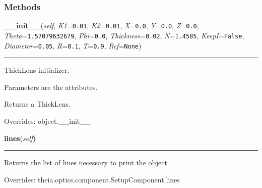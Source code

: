
  \subsubsection{Methods}

    \vspace{0.5ex}

\hspace{.8\funcindent}\begin{boxedminipage}{\funcwidth}

    \raggedright \textbf{\_\_init\_\_}(\textit{self}, \textit{K1}={\tt 0.01}, \textit{K2}={\tt 0.01}, \textit{X}={\tt 0.0}, \textit{Y}={\tt 0.0}, \textit{Z}={\tt 0.0}, \textit{Theta}={\tt 1.57079632679}, \textit{Phi}={\tt 0.0}, \textit{Thickness}={\tt 0.02}, \textit{N}={\tt 1.4585}, \textit{KeepI}={\tt False}, \textit{Diameter}={\tt 0.05}, \textit{R}={\tt 0.1}, \textit{T}={\tt 0.9}, \textit{Ref}={\tt None})

    \vspace{-1.5ex}

    \rule{\textwidth}{0.5\fboxrule}
\setlength{\parskip}{2ex}
    ThickLens initializer.

    Parameters are the attributes.

    Returns a ThickLens.

\setlength{\parskip}{1ex}
      Overrides: object.\_\_init\_\_

    \end{boxedminipage}

    \vspace{0.5ex}

\hspace{.8\funcindent}\begin{boxedminipage}{\funcwidth}

    \raggedright \textbf{lines}(\textit{self})

    \vspace{-1.5ex}

    \rule{\textwidth}{0.5\fboxrule}
\setlength{\parskip}{2ex}
    Returns the list of lines necessary to print the object.

\setlength{\parskip}{1ex}
      Overrides: theia.optics.component.SetupComponent.lines

    \end{boxedminipage}


